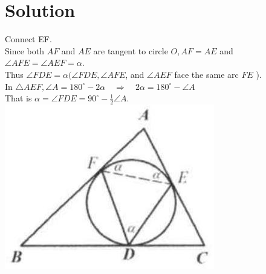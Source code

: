 \documentclass{article}
\begin{document}
\section*{Solution}
Connect EF.\\
Since both \(A F\) and \(A E\) are tangent to circle \(O, A F=A E\) and \(\angle A F E=\angle A E F=\alpha\).\\
Thus \(\angle F D E=\alpha(\angle F D E, \angle A F E\), and \(\angle A E F\) face the same arc \(F E\) ).\\
In \(\triangle A E F, \angle A=180^{\circ}-2 \alpha \quad \Rightarrow \quad 2 \alpha=180^{\circ}-\angle A\)\\
That is \(\alpha=\angle F D E=90^{\circ}-\frac{1}{2} \angle A\).\\
\centering
\includegraphics[width=\textwidth]{images/reasoning_image_1.jpg}
\end{document}
